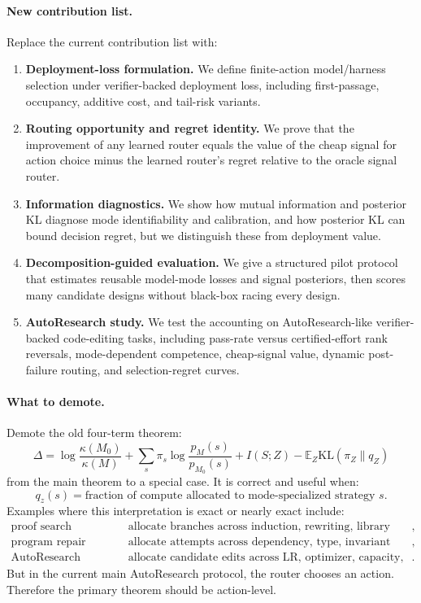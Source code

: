 \documentclass{article}
\providecommand{\KL}{\mathrm{KL}}
\begin{document}
\paragraph{New contribution list.}
Replace the current contribution list with:
\begin{enumerate}[leftmargin=1.25em,itemsep=0.15em]
    \item \textbf{Deployment-loss formulation.}
    We define finite-action model/harness selection under verifier-backed deployment loss,
    including first-passage, occupancy, additive cost, and tail-risk variants.
    \item \textbf{Routing opportunity and regret identity.}
    We prove that the improvement of any learned router equals the value of the cheap signal
    for action choice minus the learned router's regret relative to the oracle signal router.
    \item \textbf{Information diagnostics.}
    We show how mutual information and posterior KL diagnose mode identifiability and
    calibration, and how posterior KL can bound decision regret, but we distinguish these
    from deployment value.
    \item \textbf{Decomposition-guided evaluation.}
    We give a structured pilot protocol that estimates reusable model-mode losses and signal
    posteriors, then scores many candidate designs without black-box racing every design.
    \item \textbf{AutoResearch study.}
    We test the accounting on AutoResearch-like verifier-backed code-editing tasks, including
    pass-rate versus certified-effort rank reversals, mode-dependent competence, cheap-signal
    value, dynamic post-failure routing, and selection-regret curves.
\end{enumerate}

\paragraph{What to demote.}
Demote the old four-term theorem:
\[
    \Delta
    =
    \log\frac{\kappa(M_0)}{\kappa(M)}
    +
    \sum_s\pi_s\log\frac{p_M(s)}{p_{M_0}(s)}
    +
    I(S;Z)
    -
    \mathbb E_Z\KL(\pi_Z\|q_Z)
\]
from the main theorem to a special case.
It is correct and useful when:
\[
    q_z(s)=\text{fraction of compute allocated to mode-specialized strategy \(s\)}.
\]
Examples where this interpretation is exact or nearly exact include:
\[
\begin{array}{ll}
    \text{proof search} & \text{allocate branches across induction, rewriting, library search},\\
    \text{program repair} & \text{allocate attempts across dependency, type, invariant fixes},\\
    \text{AutoResearch branching} & \text{allocate candidate edits across LR, optimizer, capacity,
    schedule families}.
\end{array}
\]
But in the current main AutoResearch protocol, the router chooses an action.
Therefore the primary theorem should be action-level.
\end{document}
